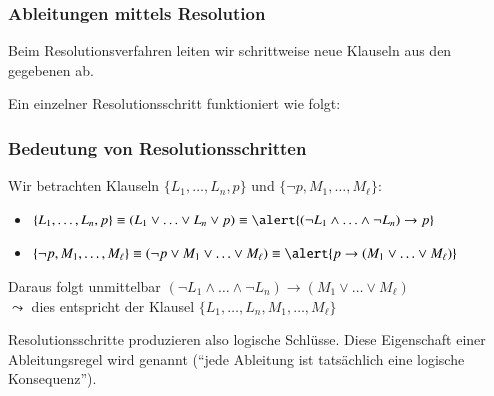 \documentclass[aspectratio=1610,onlymath]{beamer}
\begin{document}
\begin{frame}\frametitle{Ableitungen mittels Resolution}

Beim Resolutionsverfahren leiten wir schrittweise neue Klauseln aus den gegebenen ab.
\bigskip

Ein einzelner Resolutionsschritt funktioniert wie folgt:

\pause


\end{frame}

\begin{frame}\frametitle{Bedeutung von Resolutionsschritten}

Wir betrachten Klauseln $\{L_1,\ldots,L_n,p\}$ und $\{\neg p,M_1,\ldots,M_\ell\}$:\pause
\begin{itemize}
\item $\{L_1,\ldots,L_n,p\}\equiv (L_1\vee\ldots\vee L_n\vee p) \equiv \alert{(\neg L_1\wedge\ldots\wedge\neg L_n)\to p}$\pause
\item $\{\neg p,M_1,\ldots,M_\ell\}\equiv (\neg p\vee M_1\vee\ldots\vee M_\ell)\equiv \alert{p\to (M_1\vee\ldots\vee M_\ell)}$\pause
\end{itemize}\medskip

Daraus folgt unmittelbar \alert{$(\neg L_1\wedge\ldots\wedge\neg L_n)\to (M_1\vee\ldots\vee M_\ell)$}\\
$\leadsto$ dies entspricht der Klausel $\{L_1,\ldots,L_n,M_1,\ldots,M_\ell\}$\pause
\bigskip


Resolutionsschritte produzieren also logische Schlüsse. Diese Eigenschaft einer Ableitungsregel wird  genannt ("`jede Ableitung ist tatsächlich eine logische Konsequenz"').

\end{frame}
\end{document}

